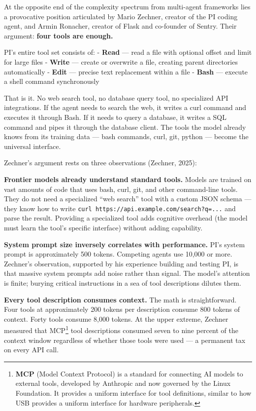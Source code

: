\documentclass[11pt, a4paper]{article}
\newcommand{\passthrough}[1]{#1}
\begin{document}
At the opposite end of the complexity spectrum from multi-agent
frameworks lies a provocative position articulated by Mario Zechner,
creator of the PI coding agent, and Armin Ronacher, creator of Flask and
co-founder of Sentry. Their argument: \textbf{four tools are enough.}

PI's entire tool set consists of: - \textbf{Read} --- read a file with
optional offset and limit for large files - \textbf{Write} --- create or
overwrite a file, creating parent directories automatically -
\textbf{Edit} --- precise text replacement within a file - \textbf{Bash}
--- execute a shell command synchronously

That is it. No web search tool, no database query tool, no specialized
API integrations. If the agent needs to search the web, it writes a curl
command and executes it through Bash. If it needs to query a database,
it writes a SQL command and pipes it through the database client. The
tools the model already knows from its training data --- bash commands,
curl, git, python --- become the universal interface.

Zechner's argument rests on three observations (Zechner, 2025):

\textbf{Frontier models already understand standard tools.} Models are
trained on vast amounts of code that uses bash, curl, git, and other
command-line tools. They do not need a specialized ``web search'' tool
with a custom JSON schema --- they know how to write
\passthrough{\lstinline!curl https://api.example.com/search?q=...!} and
parse the result. Providing a specialized tool adds cognitive overhead
(the model must learn the tool's specific interface) without adding
capability.

\textbf{System prompt size inversely correlates with performance.} PI's
system prompt is approximately 500 tokens. Competing agents use 10,000
or more. Zechner's observation, supported by his experience building and
testing PI, is that massive system prompts add noise rather than signal.
The model's attention is finite; burying critical instructions in a sea
of tool descriptions dilutes them.

\textbf{Every tool description consumes context.} The math is
straightforward. Four tools at approximately 200 tokens per description
consume 800 tokens of context. Forty tools consume 8,000 tokens. At the
upper extreme, Zechner measured that MCP\footnote{\textbf{MCP} (Model
  Context Protocol) is a standard for connecting AI models to external
  tools, developed by Anthropic and now governed by the Linux
  Foundation. It provides a uniform interface for tool definitions,
  similar to how USB provides a uniform interface for hardware
  peripherals.} tool descriptions consumed seven to nine percent of the
context window regardless of whether those tools were used --- a
permanent tax on every API call.
\end{document}
